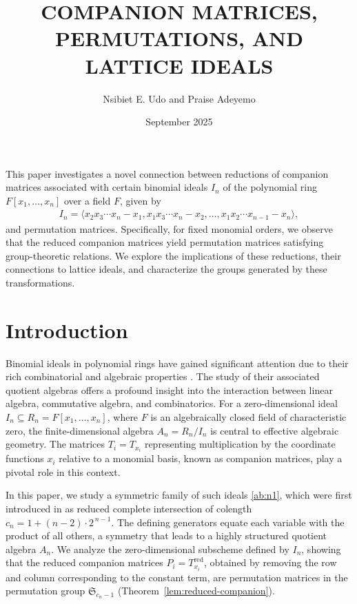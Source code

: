 \documentclass[11pt]{amsart}
\title{COMPANION MATRICES, PERMUTATIONS, AND LATTICE IDEALS}
\author{Nsibiet E. Udo and Praise Adeyemo}
\date{September 2025}
\theoremstyle{plain}
\theoremstyle{definition}
\theoremstyle{remark}
\renewenvironment{abstract}{
  \vspace{1em}
  \begin{list}{}{
    \setlength{\leftmargin}{1cm} 
    \setlength{\rightmargin}{1cm}
  }
  \item[]
  \noindent{ \scshape Abstract.}\hspace{0.3em}\footnotesize
}{
  \end{list}
  \par\vspace{1em}
}
\begin{document}
\maketitle

\begin{abstract}
This paper investigates a novel connection between reductions of companion matrices associated with certain binomial ideals \(I_n\) of the polynomial ring \( F[x_1,\dots, x_n]\) over a field \(F\), given by  \begin{align}	
		I_n=\langle x_2x_3\cdots x_n-x_1, x_1x_3\cdots x_n-x_2,\dots, x_1x_2\cdots x_{n-1}-x_{n}\rangle, \label{ab:n1}
		\end{align} and permutation matrices. Specifically, for fixed monomial orders, we observe that the reduced companion matrices yield permutation matrices satisfying group-theoretic relations. We explore the implications of these reductions, their connections to lattice ideals, and characterize the groups generated by these transformations.
\end{abstract}

\section*{Introduction}
Binomial ideals in polynomial rings have gained significant attention due to their rich combinatorial and algebraic properties \citep{Herzog2018,Stanley2016}. The study of their associated quotient algebras offers a profound insight into the interaction between linear algebra, commutative algebra, and combinatorics. For a zero-dimensional ideal \( I_n \subseteq R_n = F[x_1, \dots, x_n] \), where \(F \) is an algebraically closed field of characteristic zero, the finite-dimensional algebra \(A_n = R_n / I_n\) is central to effective algebraic geometry. The matrices \(T_i = T_{x_i} \) representing multiplication by the coordinate functions \(x_i\) relative to a monomial basis, known as companion matrices, play a pivotal role in this context.

In this paper, we study a symmetric family of such ideals \eqref{ab:n1}, which were first introduced in \citep[Proposition~2.1]{Udoetal2025} as reduced complete intersection of colength \( c_n = 1 + (n-2)\cdot 2^{\,n-1} \). The defining generators equate each variable with the product of all others, a symmetry that leads to a highly structured quotient algebra \( A_n \). We analyze the zero-dimensional subscheme defined by \( I_n \), showing that the reduced companion matrices \(P_i = T_{x_i}^{\mathrm{red}}\), obtained by removing the row and column corresponding to the constant term, are permutation matrices in the permutation group \( \mathfrak{S}_{c_n - 1} \) (Theorem~\ref{lem:reduced-companion}).
\end{document}
